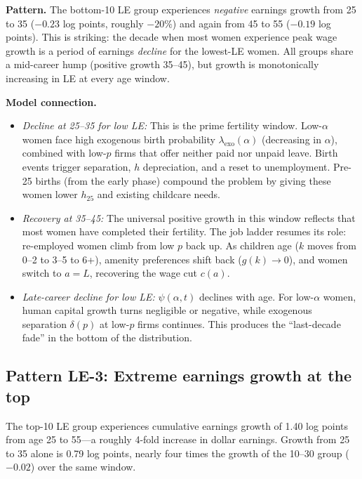 \documentclass[11pt]{article}
\begin{document}
\noindent\textbf{Pattern.} The bottom-10 LE group experiences \emph{negative} earnings growth from 25 to 35 ($-0.23$ log points, roughly $-20\%$) and again from 45 to 55 ($-0.19$ log points). This is striking: the decade when most women experience peak wage growth is a period of earnings \emph{decline} for the lowest-LE women. All groups share a mid-career hump (positive growth 35--45), but growth is monotonically increasing in LE at every age window.

\medskip\noindent\textbf{Model connection.}
\begin{itemize}[nosep]
  \item \emph{Decline at 25--35 for low LE:} This is the prime fertility window. Low-$\alpha$ women face high exogenous birth probability $\lambda_{\text{exo}}(\alpha)$ (decreasing in $\alpha$), combined with low-$p$ firms that offer neither paid nor unpaid leave. Birth events trigger separation, $h$ depreciation, and a reset to unemployment. Pre-25 births (from the early phase) compound the problem by giving these women lower $h_{25}$ and existing childcare needs.
  \item \emph{Recovery at 35--45:} The universal positive growth in this window reflects that most women have completed their fertility. The job ladder resumes its role: re-employed women climb from low $p$ back up. As children age ($k$ moves from 0--2 to 3--5 to 6+), amenity preferences shift back ($g(k) \to 0$), and women switch to $a = L$, recovering the wage cut $c(a)$.
  \item \emph{Late-career decline for low LE:} $\psi(\alpha, t)$ declines with age. For low-$\alpha$ women, human capital growth turns negligible or negative, while exogenous separation $\delta(p)$ at low-$p$ firms continues. This produces the ``last-decade fade'' in the bottom of the distribution.
\end{itemize}

\subsection{Pattern LE-3: Extreme earnings growth at the top}

The top-10 LE group experiences cumulative earnings growth of 1.40 log points from age 25 to 55---a roughly 4-fold increase in dollar earnings. Growth from 25 to 35 alone is 0.79 log points, nearly four times the growth of the 10--30 group ($-0.02$) over the same window.
\end{document}
